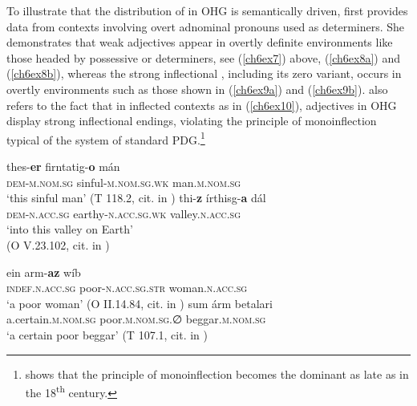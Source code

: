 \documentclass[output=paper,colorlinks,citecolor=brown]{langscibook}
\begin{document}
To illustrate that the distribution of  in OHG is
semantically driven, \citet{Demske01} first provides data from contexts
involving overt adnominal pronouns used as determiners. She demonstrates
that weak adjectives appear in overtly definite environments like those
headed by possessive or  determiners, see (\ref{ch6ex7}) above, (\ref{ch6ex8a}) and (\ref{ch6ex8b}), whereas the strong inflectional , including its zero
variant, occurs in overtly  environments such as those shown
in (\ref{ch6ex9a}) and (\ref{ch6ex9b}). \citet{Demske01} also refers to the fact that in inflected
 contexts as in (\ref{ch6ex10}), adjectives in OHG display strong
inflectional endings, violating the principle of monoinflection typical
of the system of standard PDG.\footnote{\citet{Sahel2022} shows that the
  principle of monoinflection becomes the dominant  as late as in
  the 18\textsuperscript{th} century.}

\begin{exe}
\ex\label{ch6ex8}\begin{xlist}
\ex\label{ch6ex8a}
\gll thes-\textbf{er} firntatig-\textbf{o} mán\\
\textsc{dem}-\textsc{m.nom.sg} sinful-\textsc{m.nom.sg.wk} man.\textsc{m.nom.sg}\\
\glt `this sinful man' (T 118.2, cit. in \cite[67, ex. (38b)]{Demske01})
\ex\label{ch6ex8b} 
\gll [in] thi-\textbf{z} írthisg-\textbf{a} dál\\
[in] \textsc{dem}-\textsc{n.acc.sg} earthy-\textsc{n.acc.sg.wk} valley.\textsc{n.acc.sg}\\
\glt `into this valley on Earth' \\ (O V.23.102, cit. in \cite[67, ex. (38c)]{Demske01})
\end{xlist}
\end{exe}

\begin{exe}
\ex\label{ch6ex9}\begin{xlist}
\ex\label{ch6ex9a}
\gll ein arm-\textbf{az} wíb\\
\textsc{indef.n.acc.sg} poor-\textsc{n.acc.sg.str} woman.\textsc{n.acc.sg}\\
\glt `a poor woman' (O II.14.84, cit. in \cite[67, ex. (42a)]{Demske01})
\ex\label{ch6ex9b} 
\gll sum árm betalari\\
a.certain.\textsc{m.nom.sg} poor.\textsc{m.nom.sg.∅} beggar.\textsc{m.nom.sg}\\
\glt `a certain poor beggar' (T 107.1, cit. in \cite[67, ex. (42c)]{Demske01})
\end{xlist}
\end{exe}
\end{document}
